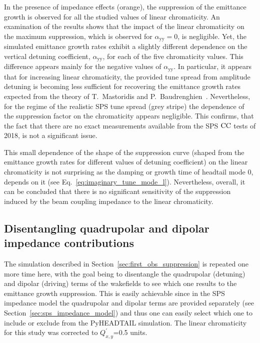 In the presence of impedance effects (orange), the suppression of the emittance growth is observed for all the studied values of linear chromaticity. An examination of the results shows that the impact of the linear chromaticity on the maximum suppression, which is observed for $\alpha_\mathrm{yy}=0$, is negligible. Yet, the simulated emittance growth rates exhibit a slightly different dependence on the vertical detuning coefficient, $\alpha_\mathrm{yy}$, for each of the five chromaticity values. This difference appears mainly for the negative values of $\alpha_\mathrm{yy}$. In particular, it appears that for increasing linear chromaticity, the provided tune spread from amplitude detuning is becoming less sufficient for recovering the emittance growth rates expected from the theory of T.~Mastoridis and P.~Baudrenghien~\cite{PhysRevSTAB.18.101001}. Nevertheless, for the regime of the realistic SPS tune spread (grey stripe) the dependence of the suppression factor on the chromaticity appears negligible. This confirms, that the fact that there are no exact measurements available from the SPS ${\mathrm{CC}}$ tests of 2018, is not a significant issue. 


This small dependence of the shape of the suppression curve (shaped from the emittance growth rates for different values of detuning coefficient) on the linear chromaticity is not surprising as the damping or growth time of headtail mode 0, depends on it (see Eq.~\eqref{eq:imaginary_tune_mode_l}). Nevertheless, overall, it can be concluded that there is no significant sensitivity of the suppression induced by the beam coupling impedance to the linear chromaticity. 

\subsection{Disentangling quadrupolar and dipolar impedance contributions}\label{subsec:quad_vs_dipole}
The simulation described in Section~\ref{sec:first_obs_suppression} is repeated one more time here, with the goal being to disentangle the quadrupolar (detuning) and dipolar (driving) terms of the wakefields to see which one results to the emittance growth suppression. This is easily achievable since in the SPS impedance model the quadrupolar and dipolar terms are provided separately (see Section~\ref{sec:sps_impedance_model}) and thus one can easily select which one to include or exclude from the PyHEADTAIL simulation. The linear chromaticity for this study was corrected to $Q^\prime_{x,y}$=0.5 units.

